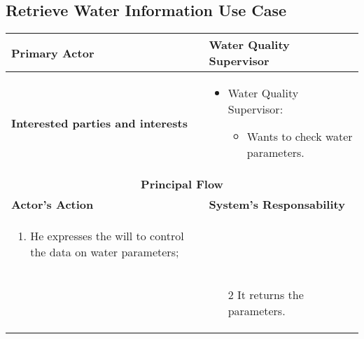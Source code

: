 \subsection{Retrieve Water Information Use Case}

\begin{longtable}{|p{7cm}|p{7cm}|}

\hline
\textbf{Primary Actor} & Water Quality Supervisor

\\


\hline
\textbf{Interested parties and interests} &
\begin{itemize}
\item Water Quality Supervisor:
	\begin{itemize}
 	\item Wants to check water parameters.
	\end{itemize}
\end{itemize}
\\


\hline
\multicolumn{2}{|c|}{\textbf{Principal Flow}} \\

\hline
\textbf{Actor's Action} & \textbf{System's Responsability}\\

\hline

\begin{enumerate}
\item He expresses the will to control the data on water parameters;
\end{enumerate} &\\

& 
\begin{enumerate}
\item[2]It returns the parameters.
\end{enumerate}\\

\hline
\end{longtable}